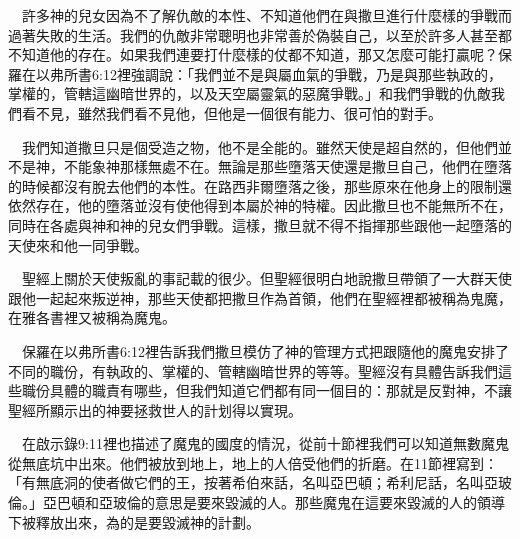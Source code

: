 \documentclass{book}
\begin{document}
\begin{center}
\noindent{}
\end{center}

　許多神的兒女因為不了解仇敵的本性、不知道他們在與撒旦進行什麼樣的爭戰而過著失敗的生活。我們的仇敵非常聰明也非常善於偽裝自己，以至於許多人甚至都不知道他的存在。如果我們連要打什麼樣的仗都不知道，那又怎麼可能打贏呢？保羅在以弗所書6:12裡強調說：「我們並不是與屬血氣的爭戰，乃是與那些執政的，掌權的，管轄這幽暗世界的，以及天空屬靈氣的惡魔爭戰。」和我們爭戰的仇敵我們看不見，雖然我們看不見他，但他是一個很有能力、很可怕的對手。

　我們知道撒旦只是個受造之物，他不是全能的。雖然天使是超自然的，但他們並不是神，不能象神那樣無處不在。無論是那些墮落天使還是撒旦自己，他們在墮落的時候都沒有脫去他們的本性。在路西非爾墮落之後，那些原來在他身上的限制還依然存在，他的墮落並沒有使他得到本屬於神的特權。因此撒旦也不能無所不在，同時在各處與神和神的兒女們爭戰。這樣，撒旦就不得不指揮那些跟他一起墮落的天使來和他一同爭戰。

　聖經上關於天使叛亂的事記載的很少。但聖經很明白地說撒旦帶領了一大群天使跟他一起起來叛逆神，那些天使都把撒旦作為首領，他們在聖經裡都被稱為鬼魔，在雅各書裡又被稱為魔鬼。

　保羅在以弗所書6:12裡告訴我們撒旦模仿了神的管理方式把跟隨他的魔鬼安排了不同的職份，有執政的、掌權的、管轄幽暗世界的等等。聖經沒有具體告訴我們這些職份具體的職責有哪些，但我們知道它們都有同一個目的：那就是反對神，不讓聖經所顯示出的神要拯救世人的計划得以實現。

　在啟示錄9:11裡也描述了魔鬼的國度的情況，從前十節裡我們可以知道無數魔鬼從無底坑中出來。他們被放到地上，地上的人倍受他們的折磨。在11節裡寫到：「有無底洞的使者做它們的王，按著希伯來話，名叫亞巴頓；希利尼話，名叫亞玻倫。」亞巴頓和亞玻倫的意思是要來毀滅的人。那些魔鬼在這要來毀滅的人的領導下被釋放出來，為的是要毀滅神的計劃。
\end{document}
